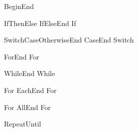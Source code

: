 \usepackage[font={small,sf}]{caption}
\captionsetup{labelsep=dot}

\usepackage{subcaption}
\captionsetup{subrefformat=parens}

\renewcommand*\l@figure{\@dottedtocline{1}{0em}{2.3em}}
\renewcommand*\l@table{\@dottedtocline{1}{0em}{2.3em}}







           {Begin}{End}

        {If}{Then}{Else If}{Else}{End If}

            {Switch}{}{Case}{Otherwise}{End Case}{End Switch}

         {For}{}{End For}

         {While}{}{End While}

         {For Each}{}{End For}

         {For All}{}{End For}

            {Repeat}{Until}




\newlength{\tocPartLength}
\newlength{\tocPartLineLength}

